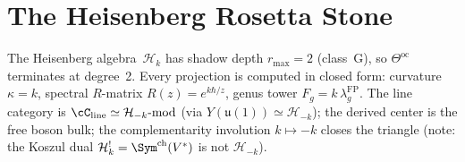 %

\providecommand{\barB}{\bar{B}}
\providecommand{\cA}{\mathcal{A}}
\providecommand{\cH}{\mathcal{H}}
\providecommand{\SCchtop}{\mathsf{SC}^{\mathrm{ch,top}}}
\providecommand{\Ainf}{\mathsf{A}_{\infty}}
\providecommand{\Eone}{\mathsf{E}_1}
\providecommand{\Einf}{\mathsf{E}_{\infty}}
\providecommand{\Pinf}{\mathsf{P}_{\infty}}
\providecommand{\PVA}{\mathsf{PVA}}
\providecommand{\Ass}{\mathsf{Ass}}
\providecommand{\FM}{\mathrm{FM}}
\providecommand{\Conf}{C}
\providecommand{\dfib}{d_{\mathrm{fib}}}
\providecommand{\Dg}[1]{D_{#1}}
\providecommand{\dzero}{d_0}
\providecommand{\barBch}{\bar{B}^{\mathrm{ch}}}
\providecommand{\Omegach}{\Omega^{\mathrm{ch}}}
\providecommand{\bC}{\mathbb{C}}
\providecommand{\bR}{\mathbb{R}}
\providecommand{\C}{\mathbb{C}}
\providecommand{\R}{\mathbb{R}}
\providecommand{\Z}{\mathbb{Z}}
\providecommand{\fg}{\mathfrak{g}}
\providecommand{\id}{\mathrm{id}}
\providecommand{\Res}{\operatorname{Res}}
\providecommand{\Ran}{\operatorname{Ran}}
\providecommand{\chirCom}{\mathsf{Com}^{\mathrm{ch}}}
\providecommand{\chirLie}{\mathsf{Lie}^{\mathrm{ch}}}
\providecommand{\Linf}{\mathsf{L}_{\infty}}
\providecommand{\Hom}{\operatorname{Hom}}
\providecommand{\colldiv}[2]{D_{#1#2}}
\providecommand{\LogForm}[2]{\eta_{#1#2}}


\section{The Heisenberg Rosetta Stone}
\label{sec:rosetta-stone}

The Heisenberg algebra~$\cH_k$ has shadow depth $r_{\max} = 2$ (class~G), so $\Theta^{\mathrm{oc}}$ terminates at degree~2. Every projection is computed in closed form: curvature $\kappa = k$, spectral $R$-matrix $R(z) = e^{k\hbar/z}$, genus tower $F_g = k\,\lambda_g^{\mathrm{FP}}$. The line category is $\cC_{\mathrm{line}} \simeq \cH_{-k}\text{-mod}$ (via $Y(\mathfrak{u}(1)) \simeq \cH_{-k}$); the derived center is the free boson bulk; the complementarity involution $k \mapsto -k$ closes the triangle (note: the Koszul dual $\cH_k^! = \Sym^{\mathrm{ch}}(V^*)$ is not $\cH_{-k}$).

